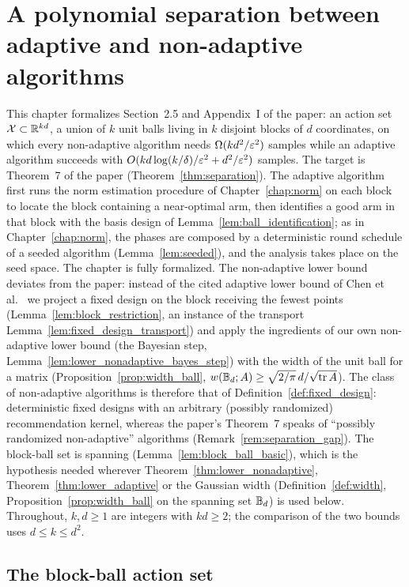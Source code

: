 \chapter{A polynomial separation between adaptive and non-adaptive algorithms}
\label{chap:separation}

This chapter formalizes Section~2.5 and Appendix~I of the paper: an action set
$\mathcal{X} \subset \mathbb{R}^{kd}$, a union of $k$ unit balls living in $k$ disjoint blocks of $d$
coordinates, on which every non-adaptive algorithm needs $\Omega(kd^2/\varepsilon^2)$ samples while
an adaptive algorithm succeeds with $O(kd\log(k/\delta)/\varepsilon^2 + d^2/\varepsilon^2)$ samples. The
target is Theorem~7 of the paper (Theorem~\ref{thm:separation}). The adaptive algorithm
first runs the norm estimation procedure of Chapter~\ref{chap:norm} on each block to locate
the block containing a near-optimal arm, then identifies a good arm in that block with the
basis design of Lemma~\ref{lem:ball_identification}; as in Chapter~\ref{chap:norm}, the
phases are composed by a deterministic round schedule of a seeded algorithm
(Lemma~\ref{lem:seeded}), and the analysis takes place on the seed space. The chapter is
fully formalized. The non-adaptive lower bound deviates from the paper: instead of
the cited adaptive lower bound of Chen et al.\ \cite{chen2024assouad} we project a fixed
design on the block receiving the fewest points (Lemma~\ref{lem:block_restriction}, an
instance of the transport Lemma~\ref{lem:fixed_design_transport}) and apply the ingredients
of our own non-adaptive lower bound (the Bayesian step,
Lemma~\ref{lem:lower_nonadaptive_bayes_step}) with the width of the unit ball for a matrix
(Proposition~\ref{prop:width_ball}, $w(\mathbb{B}_d;A) \ge \sqrt{2/\pi}\,d/\sqrt{\operatorname{tr} A}$). The class of
non-adaptive algorithms is therefore that of Definition~\ref{def:fixed_design}: deterministic
fixed designs with an arbitrary (possibly randomized) recommendation kernel, whereas the
paper's Theorem~7 speaks of ``possibly randomized non-adaptive'' algorithms
(Remark~\ref{rem:separation_gap}). The block-ball set is spanning
(Lemma~\ref{lem:block_ball_basic}), which is the hypothesis needed wherever
Theorem~\ref{thm:lower_nonadaptive}, Theorem~\ref{thm:lower_adaptive} or the Gaussian width
(Definition~\ref{def:width}, Proposition~\ref{prop:width_ball} on the spanning set $\mathbb{B}_d$)
is used below. Throughout,
$k, d \ge 1$ are integers with $kd \ge 2$; the comparison of the two bounds uses
$d \le k \le d^2$.

\section{The block-ball action set}
\label{sec:separation_set}

